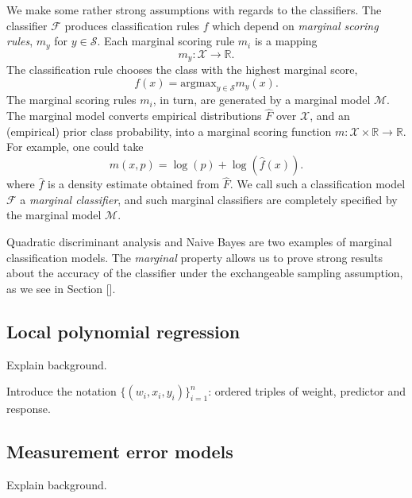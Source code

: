 \documentclass[12pt]{article}
\begin{document}
We make some rather strong assumptions with regards to the
classifiers.  The classifier $\mathcal{F}$ produces classification
rules $f$ which depend on \emph{marginal scoring rules}, $m_y$ for $y
\in \mathcal{S}$.  Each marginal scoring rule $m_i$ is a mapping
\[
m_y: \mathcal{X} \to \mathbb{R}.
\]
The classification rule chooses the class with the highest marginal score,
\[
f(x) = \text{argmax}_{y \in \mathcal{S}} m_y(x).
\]
The marginal scoring rules $m_i$, in turn, are generated by a marginal
model $\mathcal{M}$.  The marginal model converts empirical
distributions $\hat{F}$ over $\mathcal{X}$, and an (empirical) prior
class probability, into a marginal scoring function $m: \mathcal{X}
\times \mathbb{R} \to \mathbb{R}$.  For example, one could take 
\[m(x,p) = \log(p) + \log(\hat{f}(x)).\]
where $\hat{f}$ is a density estimate obtained from
$\hat{F}$.  We call such a classification model $\mathcal{F}$ a
\emph{marginal classifier}, and such marginal classifiers are
completely specified by the marginal model $\mathcal{M}.$

Quadratic discriminant analysis and Naive Bayes are two examples of
marginal classification models.
The \emph{marginal} property allows us to prove strong results about
the accuracy of the classifier under the exchangeable sampling
assumption, as we see in Section [].

\subsection{Local polynomial regression}

Explain background.

Introduce the notation $\{(w_i, x_i, y_i)\}_{i=1}^n$: ordered triples
of weight, predictor and response.

\subsection{Measurement error models}

Explain background.
\end{document}
